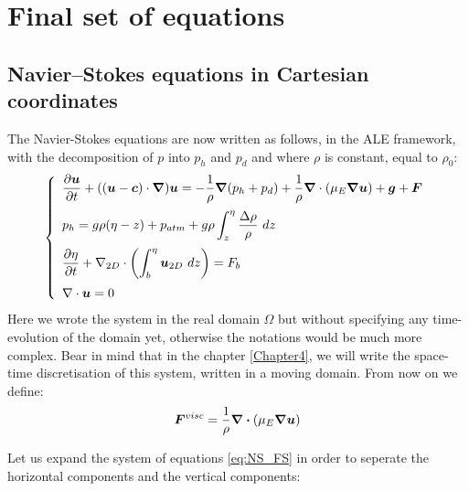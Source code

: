 \section{Final set of equations}\label{sec:FS-NS}

\subsection{Navier--Stokes equations in Cartesian coordinates}

The Navier-Stokes equations are now written as follows, in the ALE framework,
with the decomposition of $p$ into $p_h$ and $p_d$ and where $\rho$ is constant, equal to $\rho_0$:
\begin{equation}
\left\{\begin{array}{l}
  \displaystyle{\dfrac{\partial \vec{u} }{\partial t} + ((\vec{u}-\vec{c}) \cdot \Grad) \vec{u} = -\dfrac{1}{\rho} \Grad (p_h+p_d) + \dfrac{1}{\rho} \BDiv \left(\mu_E \Grad \vec{u}\right)+ \vec{g} + \vec{F}}\medskip\\
  \displaystyle{p_h = g\rho(\eta-z) + p_{atm} + g\rho\int_z^\eta\dfrac{\Delta\rho}{\rho}~dz}\medskip\\
  \displaystyle{\dfrac{\partial\eta}{\partial t}
  + \DivD\left(\int_b^\eta\vec{u}_{2D}~dz\right) = F_b} \medskip \\
  \displaystyle{\Div \vec{u} = 0}
  \label{eq:NS_FS}
\end{array}\right.
\end{equation}
Here we wrote the system in the real domain $\Omega$ but without specifying any time-evolution of the domain yet, otherwise
the notations would be much more complex. Bear in mind that in the chapter \ref{Chapter4}, we will
write the space-time discretisation of this system, written in a moving domain.
From now on we define:
\begin{align}
  \bm{F}^{visc}= \dfrac{1}{\rho} \bm{\nabla \cdot} \left(\mu_E \bm{\nabla} \bm{u}\right)
  \label{eq:visc_forces}
\end{align}

Let us expand the system of equations \eqref{eq:NS_FS} in order to seperate the horizontal components and the vertical components:

